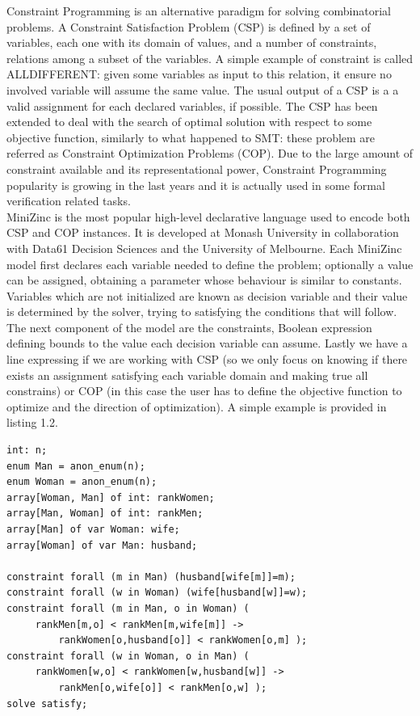 Constraint Programming is an alternative paradigm for solving combinatorial problems. A Constraint Satisfaction Problem (CSP) is defined by a set of variables, each one with its domain of values, and a number of constraints, relations among a subset of the variables. A simple example of constraint is called ALLDIFFERENT: given some variables as input to this relation, it ensure no involved variable will assume the same value. The usual output of a CSP is a a valid assignment for each declared variables, if possible. The CSP has been extended to deal with the search of optimal solution with respect to some objective function, similarly to what happened to SMT: these problem are referred as Constraint Optimization Problems (COP).
Due to the large amount of constraint available and its representational power, Constraint Programming popularity is growing in the last years and it is actually used in some formal verification related tasks. \\
MiniZinc is the most popular high-level declarative language used to encode both CSP and COP instances. It is developed at Monash University in collaboration with Data61 Decision Sciences and the University of Melbourne. Each MiniZinc model first declares each variable needed to define the problem; optionally a value can be assigned, obtaining a parameter whose behaviour is similar to constants. Variables which are not initialized are known as decision variable and their value is determined by the solver, trying to satisfying the conditions that will follow. The next component of the model are the constraints, Boolean expression defining bounds to the value each decision variable can assume. Lastly we have a line expressing if we are working with CSP (so we only focus on knowing if there exists an assignment satisfying each variable domain and making true all constrains) or COP (in this case the user has to define the objective function to optimize and the direction of optimization). A simple example is provided in listing 1.2.

\begin{lstlisting}[style=interfaces,caption=An example of MiniZinc encoding regarding the popular Stable Marriage Problem.]
int: n;
enum Man = anon_enum(n);
enum Woman = anon_enum(n);
array[Woman, Man] of int: rankWomen;
array[Man, Woman] of int: rankMen;
array[Man] of var Woman: wife;
array[Woman] of var Man: husband;

constraint forall (m in Man) (husband[wife[m]]=m);
constraint forall (w in Woman) (wife[husband[w]]=w);
constraint forall (m in Man, o in Woman) (
     rankMen[m,o] < rankMen[m,wife[m]] -> 
         rankWomen[o,husband[o]] < rankWomen[o,m] );
constraint forall (w in Woman, o in Man) (
     rankWomen[w,o] < rankWomen[w,husband[w]] -> 
         rankMen[o,wife[o]] < rankMen[o,w] );
solve satisfy;
\end{lstlisting}


